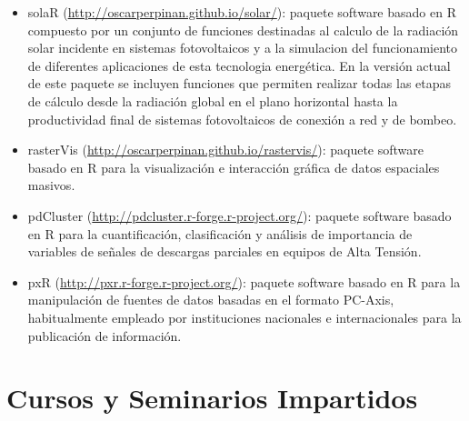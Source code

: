 \documentclass[article, a4paper]{memoir}
\begin{document}
\begin{itemize}
\item solaR (\url{http://oscarperpinan.github.io/solar/}): paquete software basado
en R compuesto por un conjunto de funciones destinadas al calculo de
la radiación solar incidente en sistemas fotovoltaicos y a la
simulacion del funcionamiento de diferentes aplicaciones de esta
tecnologia energética. En la versión actual de este paquete se
incluyen funciones que permiten realizar todas las etapas de cálculo
desde la radiación global en el plano horizontal hasta la
productividad final de sistemas fotovoltaicos de conexión a red y de
bombeo.

\item rasterVis (\url{http://oscarperpinan.github.io/rastervis/}): paquete software
basado en R para la visualización e interacción gráfica de datos
espaciales masivos.

\item pdCluster (\url{http://pdcluster.r-forge.r-project.org/}): paquete
software basado en R para la cuantificación, clasificación y
análisis de importancia de variables de señales de descargas
parciales en equipos de Alta Tensión.

\item pxR (\url{http://pxr.r-forge.r-project.org/}): paquete software basado en
R para la manipulación de fuentes de datos basadas en el formato
PC-Axis, habitualmente empleado por instituciones nacionales e
internacionales para la publicación de información.
\end{itemize}



\section{Cursos y Seminarios Impartidos}
\label{sec-8}
\end{document}
